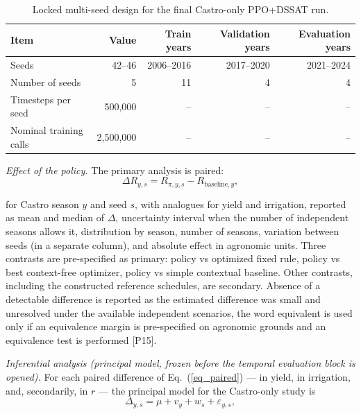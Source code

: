 \documentclass[times,final,authoryear]{elsarticle}
\begin{document}
\begin{table}[!h]
\centering
\scriptsize
\caption{Locked multi-seed design for the final Castro-only PPO+DSSAT run.}
\label{tab_multiseed_manifest_castro}
\begin{tabular}{lrrrr}
\hline
Item & Value & Train years & Validation years & Evaluation years \\
\hline
Seeds & 42--46 & 2006--2016 & 2017--2020 & 2021--2024 \\
Number of seeds & 5 & 11 & 4 & 4 \\
Timesteps per seed & 500,000 & -- & -- & -- \\
Nominal training calls & 2,500,000 & -- & -- & -- \\
\hline
\end{tabular}
\end{table}

\emph{Effect of the policy.} The primary analysis is paired:
\begin{equation}

\Delta R_{y,s} = R_{\pi,y,s} - R_{\text{baseline},y},

\label{eq_paired}
\end{equation}

for Castro season $y$ and seed $s$, with analogues for yield and irrigation, reported as mean and median of $\Delta$, uncertainty interval when the number of independent seasons allows it, distribution by season, number of seasons, variation between seeds (in a separate column), and absolute effect in agronomic units. Three contrasts are pre-specified as primary: policy vs optimized fixed rule, policy vs best context-free optimizer, policy vs simple contextual baseline. Other contrasts, including the constructed reference schedules, are secondary. Absence of a detectable difference is reported as the estimated difference was small and unresolved under the available independent scenarios, the word equivalent is used only if an equivalence margin is pre-specified on agronomic grounds and an equivalence test is performed [P15].

\emph{Inferential analysis (principal model, frozen before the temporal evaluation block is opened).} For each paired difference of Eq.~(\ref{eq_paired}) --- in yield, in irrigation, and, secondarily, in $r$ --- the principal model for the Castro-only study is
\begin{equation}

\Delta_{y,s} = \mu + v_y + w_s + \varepsilon_{y,s},

\label{eq_mixed}
\end{equation}
\end{document}
